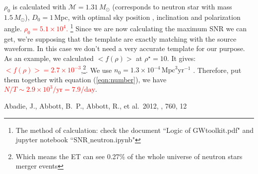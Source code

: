 \documentclass[fleqn,usenatbib]{mnras}
\begin{document}
$\rho_0$ is calculated with $\mathcal{M}=1.31\,M_\odot$ (corresponds to neutron star with mass $1.5\,M_\odot$), $D_0=1$\,Mpc, with optimal sky position , inclination and polarization angle. \textcolor{red}{$\rho_0=5.1\times10^4$.} \footnote{The method of calculation: check the document ``Logic of GWtoolkit.pdf" and jupyter notebook ``SNR$\_$neutron.ipynb"} Since we are now calculating the maximum SNR we can get, we're supposing that the template are exactly matching with the source waveform. In this case we don't need a very accurate template for our purpose. As an example, we calculated $<f(\rho)>$ at $\rho^\star=10$. It gives: \textcolor{red}{$<f(\rho)>=2.7\times10^{-3}$},\footnote{Which means the ET can see 0.27\% of the whole universe of neutron stars merger events}. We use $n_0=1.3\times10^{-4}\,\text{Mpc}^3\text{yr}^{-1}$ \citep{2012ApJ...760...12A}. Therefore, put them together with equation (\ref{eqn:number}), we have \textcolor{red}{$N/T\sim2.9\times10^3/\text{yr}=7.9/\text{day}$}. 

\begin{thebibliography}{99}
 Abadie, J., Abbott, B.~P., Abbott, R., et al.\ 2012, \apj, 760, 12
\end{thebibliography}
\end{document}
